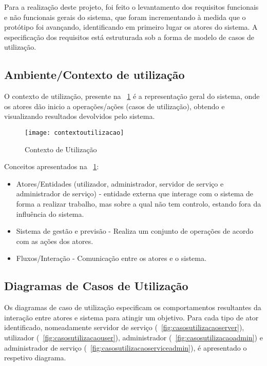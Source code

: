 Para a realização deste projeto, foi feito o levantamento dos requisitos funcionais e não funcionais gerais do sistema, que foram incrementando à medida que o protótipo foi avançando, identificando em primeiro lugar os atores do sistema. A especificação dos requisitos está estruturada sob a forma de modelo de casos de utilização.

\subsection{Ambiente/Contexto de utilização}

O contexto de utilização, presente na \figurename~\ref{fig:contextoutilizacao} é a representação geral do sistema, onde os atores dão inicio a operações/ações (casos de utilização), obtendo e visualizando resultados devolvidos pelo sistema. 

\begin{figure}[ht]
	\centering
	\texttt{[image: contextoutilizacao]}
	\caption{Contexto de Utilização}
  	\label{fig:contextoutilizacao}
\end{figure}

Conceitos apresentados na \figurename~\ref{fig:contextoutilizacao}: 

\begin{itemize}
	\item Atores/Entidades (utilizador, administrador, servidor de serviço e administrador de serviço) - entidade externa que interage com o sistema de forma a realizar trabalho, mas sobre a qual não tem controlo, estando fora da influência do sistema.
	\item Sistema de gestão e previsão - Realiza um conjunto de operações de acordo com as ações dos atores.
	\item Fluxos/Interação - Comunicação entre os atores e o sistema.
\end{itemize}

\subsection{Diagramas de Casos de Utilização}

Os diagramas de caso de utilização especificam os comportamentos resultantes da interação entre atores e sistema para atingir um objetivo. Para cada tipo de ator identificado, nomeadamente servidor de serviço (\figurename~\ref{fig:casosutilizacaoserver}), utilizador (\figurename~\ref{fig:casosutilizacaouser}), administrador (\figurename~\ref{fig:casosutilizacaoadmin}) e administrador de serviço (\figurename~\ref{fig:casosutilizacaoserviceadmin}), é apresentado o respetivo diagrama. 


